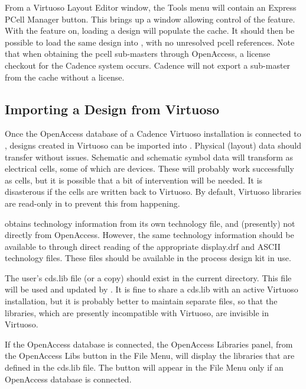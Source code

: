 From a Virtuoso Layout Editor window, the {\cb Tools} menu will
contain an {\cb Express PCell Manager} button.  This brings up a
window allowing control of the feature.  With the feature on, loading
a design will populate the cache.  It should then be possible to load
the same design into {\Xic}, with no unresolved pcell references. 
Note that when obtaining the pcell sub-masters through OpenAccess, a
license checkout for the Cadence system occurs.  Cadence will not
export a sub-master from the cache without a license.
\fi


\ifoa
\subsection{Importing a Design from Virtuoso}

Once the OpenAccess database of a Cadence Virtuoso installation is
connected to {\Xic}, designs created in Virtuoso can be imported
into {\Xic}.  Physical (layout) data should transfer without issues. 
Schematic and schematic symbol data will transform as electrical
cells, some of which are devices.  These will probably work
successfully as {\Xic} cells, but it is possible that a bit of
intervention will be needed.  It is disasterous if the cells are
written back to Virtuoso.  By default, Virtuoso libraries are
read-only in {\Xic} to prevent this from happening.

{\Xic} obtains technology information from its own technology file,
and (presently) not directly from OpenAccess.  However, the same
technology information should be available to {\Xic} through direct
reading of the appropriate {\vt display.drf} and ASCII technology
files.  These files should be available in the process design kit in
use.

The user's {\vt cds.lib} file (or a copy) should exist in the current
directory.  This file will be used and updated by {\Xic}.  It is fine
to share a {\vt cds.lib} with an active Virtuoso installation, but it
is probably better to maintain separate files, so that the {\Xic}
libraries, which are presently incompatible with Virtuoso, are
invisible in Virtuoso.

If the OpenAccess database is connected, the {\cb OpenAccess
Libraries} panel, from the {\cb OpenAccess Libs} button in the {\cb
File Menu}, will display the libraries that are defined in the {\vt
cds.lib} file.  The button will appear in the {\cb File Menu} only if
an OpenAccess database is connected.

